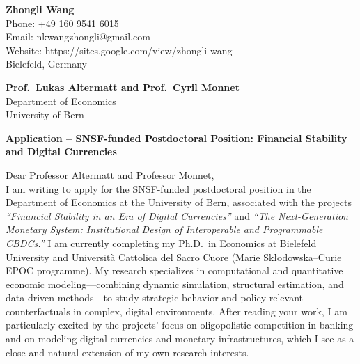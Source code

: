 \documentclass[11pt]{article}
\begin{document}
\noindent
\textbf{Zhongli Wang} \\
Phone: +49 160 9541 6015 \\
Email: nkwangzhongli@gmail.com \\
Website: https://sites.google.com/view/zhongli-wang \\
Bielefeld, Germany \\

\vspace{0.5cm}

\noindent
\textbf{Prof.\ Lukas Altermatt and Prof.\ Cyril Monnet} \\
Department of Economics \\
University of Bern \\

\vspace{0.4cm}

\noindent
\textbf{Application -- SNSF-funded Postdoctoral Position: Financial Stability and Digital Currencies} \\

\vspace{0.3cm}

\noindent Dear Professor Altermatt and Professor Monnet,\\[0.2cm]

I am writing to apply for the SNSF-funded postdoctoral position in the Department of Economics at the University of Bern, associated with the projects \textit{``Financial Stability in an Era of Digital Currencies''} and \textit{``The Next-Generation Monetary System: Institutional Design of Interoperable and Programmable CBDCs.''} I am currently completing my Ph.D.\ in Economics at Bielefeld University and Universit\`a Cattolica del Sacro Cuore (Marie Sk\l{}odowska--Curie EPOC programme). My research specializes in computational and quantitative economic modeling---combining dynamic simulation, structural estimation, and data-driven methods---to study strategic behavior and policy-relevant counterfactuals in complex, digital environments. After reading your work, I am particularly excited by the projects' focus on oligopolistic competition in banking and on modeling digital currencies and monetary infrastructures, which I see as a close and natural extension of my own research interests.
\end{document}
